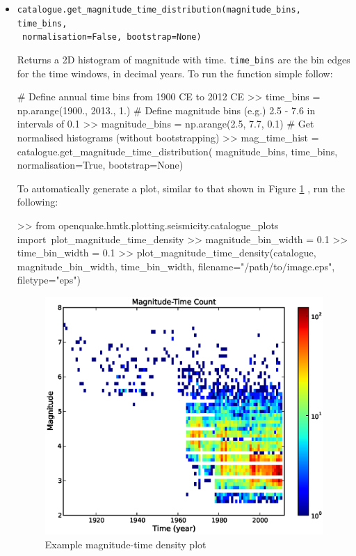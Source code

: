 \begin{itemize}
\item \verb;catalogue.get_magnitude_time_distribution(magnitude_bins, time_bins,;\\
\verb; normalisation=False, bootstrap=None);

Returns a 2D histogram of magnitude with time. \verb=time_bins= are the bin edges for the time windows, in decimal years. To run the function simple follow:

\begin{python}[frame=single]
# Define annual time bins from 1900 CE to 2012 CE
>> time_bins = np.arange(1900., 2013., 1.)
# Define magnitude bins (e.g.) 2.5 - 7.6 in intervals of 0.1
>> magnitude_bins = np.arange(2.5, 7.7, 0.1)
# Get normalised histograms (without bootstrapping)
>> mag_time_hist = catalogue.get_magnitude_time_distribution(
    magnitude_bins,
    time_bins,
    normalisation=True,
    bootstrap=None)
\end{python}

To automatically generate a plot, similar to that shown in Figure \ref{fig:mag_time_density} , run the following:

\begin{python}[frame=single]
>> from openquake.hmtk.plotting.seismicity.catalogue_plots import\
    plot_magnitude_time_density
>> magnitude_bin_width = 0.1
>> time_bin_width = 0.1 
>> plot_magnitude_time_density(catalogue,
                               magnitude_bin_width,
                               time_bin_width,
                               filename="/path/to/image.eps", 
                               filetype="eps")
\end{python}

\begin{figure}[htb]
  \centering
      \includegraphics[trim=10mm 8mm 10mm 10mm, clip, width=12cm]{./figures/magnitude_time_density.eps}
  \caption{Example magnitude-time density plot}
  \label{fig:mag_time_density}
\end{figure}
\end{itemize}

